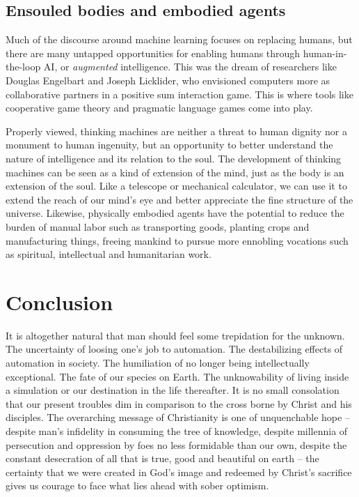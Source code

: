 \documentclass[sigplan,nonacm]{acmart}\settopmatter{printfolios=false,printccs=false,printacmref=false}
\begin{document}
\subsection{Ensouled bodies and embodied agents}

Much of the discourse around machine learning focuses on replacing humans, but there are many untapped opportunities for enabling humans through human-in-the-loop AI, or \textit{augmented} intelligence. This was the dream of researchers like Douglas Engelbart and Joseph Licklider, who envisioned computers more as collaborative partners in a positive sum interaction game. This is where tools like cooperative game theory and pragmatic language games come into play.

Properly viewed, thinking machines are neither a threat to human dignity nor a monument to human ingenuity, but an opportunity to better understand the nature of intelligence and its relation to the soul. The development of thinking machines can be seen as a kind of extension of the mind, just as the body is an extension of the soul. Like a telescope or mechanical calculator, we can use it to extend the reach of our mind's eye and better appreciate the fine structure of the universe. Likewise, physically embodied agents have the potential to reduce the burden of manual labor such as transporting goods, planting crops and manufacturing things, freeing mankind to pursue more ennobling vocations such as spiritual, intellectual and humanitarian work.

\clearpage\section{Conclusion}

It is altogether natural that man should feel some trepidation for the unknown. The uncertainty of loosing one's job to automation. The destabilizing effects of automation in society. The humiliation of no longer being intellectually exceptional. The fate of our species on Earth. The unknowability of living inside a simulation or our destination in the life thereafter. It is no small consolation that our present troubles dim in comparison to the cross borne by Christ and his disciples. The overarching message of Christianity is one of unquenchable hope -- despite man's infidelity in consuming the tree of knowledge, despite millennia of persecution and oppression by foes no less formidable than our own, despite the constant desecration of all that is true, good and beautiful on earth -- the certainty that we were created in God's image and redeemed by Christ's sacrifice gives us courage to face what lies ahead with sober optimism.
\end{document}
